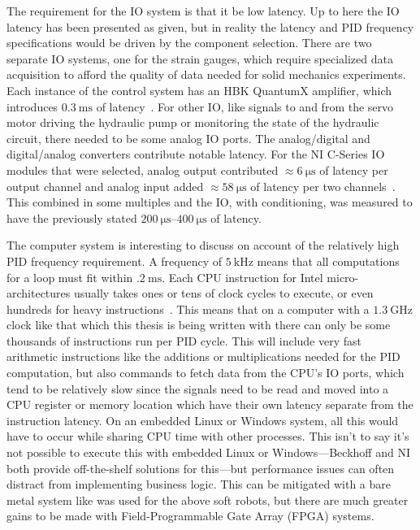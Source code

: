 \documentclass[english,12pt,a4paper,pdftex,eng,utf8]{aaltothesis}
\begin{document}
The requirement for the IO system is that it be low latency.  Up to here the IO latency has been presented as given, but in reality the latency and PID
frequency specifications would be driven by the component selection.  There are two separate IO systems, one for the strain gauges, which require specialized data acquisition to afford the quality of data needed for solid mechanics experiments.  Each instance of the control system has an HBK QuantumX amplifier, which introduces $\qty{0.3}{\milli\second}$ of latency~\cite{HBKQuantumX}.  For other IO, like signals to and from the servo motor driving the hydraulic pump or monitoring the state of the hydraulic circuit, there needed to be some analog IO ports.  The analog/digital and digital/analog converters contribute notable latency.  For the NI C-Series IO modules that were selected, analog output contributed $\approx\qty{6}{\micro\second}$ of latency per output channel and analog input added $\approx\qty{58}{\micro\second}$ of latency per two channels~\cite{NI-9220,NI-9266}.  This combined in some multiples and the IO, with conditioning, was measured to have the previously stated $ \qtyrange[range-units=single,range-phrase=..]{200}{400}{\micro\second}$ of latency.

The computer system is interesting to discuss on account of the relatively high PID frequency requirement.  A frequency of $\qty{5}{\kilo\hertz}$ means that all computations for a loop must fit within $\qty{.2}{\milli\second}$.  Each CPU instruction for Intel micro-architectures usually takes ones or tens of clock cycles to execute, or even hundreds for heavy instructions~\cite{Abel19a}.  This means that on a computer with a $\qty{1.3}{\giga\hertz}$ clock like that which this thesis is being written with there can only be some thousands of instructions run per PID cycle.  This will include very fast arithmetic instructions like the additions or multiplications needed for the PID computation, but also commands to fetch data from the CPU's IO ports, which tend to be relatively slow since the signals need to be read and moved into a CPU register or memory location which have their own latency separate from the instruction latency.  On an embedded Linux or Windows system, all this would have to occur while sharing CPU time with other processes.  This isn't to say it's not possible to execute this with embedded Linux or Windows---Beckhoff and NI both provide off-the-shelf solutions for this---but performance issues can often distract from implementing business logic.  This can be mitigated with a bare metal system like was used for the above soft robots, but there are much greater gains to be made with Field-Programmable Gate Array (FPGA) systems.
\end{document}
